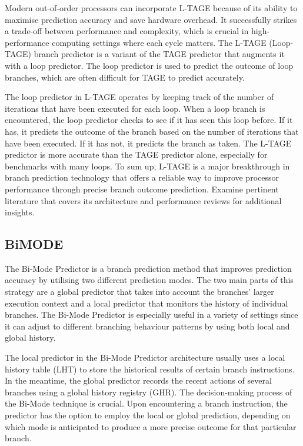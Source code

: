 \documentclass[10pt,journal,compsoc]{IEEEtran}
\begin{document}
Modern out-of-order processors can incorporate L-TAGE because of its ability to maximise prediction accuracy and save hardware overhead. It successfully strikes a trade-off between performance and complexity, which is crucial in high-performance computing settings where each cycle matters.
The L-TAGE (Loop-TAGE) branch predictor is a variant of the TAGE predictor that augments it with a loop predictor. The loop predictor is used to predict the outcome of loop branches, which are often difficult for TAGE to predict accurately.

The loop predictor in L-TAGE operates by keeping track of the number of iterations that have been executed for each loop. When a loop branch is encountered, the loop predictor checks to see if it has seen this loop before. If it has, it predicts the outcome of the branch based on the number of iterations that have been executed. If it has not, it predicts the branch as taken.\cite{seznec64KbytesISLTAGE}
The L-TAGE predictor is more accurate than the TAGE predictor alone, especially for benchmarks with many loops.
To sum up, L-TAGE is a major breakthrough in branch prediction technology that offers a reliable way to improve processor performance through precise branch outcome prediction. Examine pertinent literature that covers its architecture and performance reviews for additional insights.
\subsection{BiMODE}
\noindent The Bi-Mode Predictor is a branch prediction method that improves prediction accuracy by utilising two different prediction modes. The two main parts of this strategy are a global predictor that takes into account the branches' larger execution context and a local predictor that monitors the history of individual branches. The Bi-Mode Predictor is especially useful in a variety of settings since it can adjust to different branching behaviour patterns by using both local and global history.

The local predictor in the Bi-Mode Predictor architecture usually uses a local history table (LHT) to store the historical results of certain branch instructions. In the meantime, the global predictor records the recent actions of several branches using a global history registry (GHR). The decision-making process of the Bi-Mode technique is crucial. Upon encountering a branch instruction, the predictor has the option to employ the local or global prediction, depending on which mode is anticipated to produce a more precise outcome for that particular branch.
\end{document}
